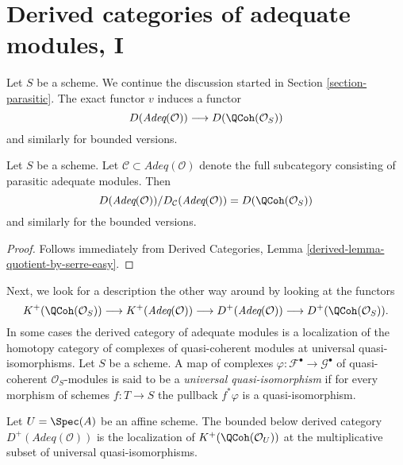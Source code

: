 \section{Derived categories of adequate modules, I}
\label{section-comparison}


\noindent
Let $S$ be a scheme. We continue the discussion started in
Section \ref{section-parasitic}.
The exact functor $v$ induces a functor
$$
D(\textit{Adeq}(\mathcal{O}))
\longrightarrow
D(\QCoh(\mathcal{O}_S))
$$
and similarly for bounded versions.

\begin{lemma}
\label{lemma-quotient-easy}
Let $S$ be a scheme. Let
$\mathcal{C} \subset \textit{Adeq}(\mathcal{O})$ denote the
full subcategory consisting of parasitic adequate modules.
Then
$$
D(\textit{Adeq}(\mathcal{O}))/D_\mathcal{C}(\textit{Adeq}(\mathcal{O}))
= D(\QCoh(\mathcal{O}_S))
$$
and similarly for the bounded versions.
\end{lemma}

\begin{proof}
Follows immediately from
Derived Categories, Lemma \ref{derived-lemma-quotient-by-serre-easy}.
\end{proof}

\noindent
Next, we look for a description the other way around by looking at
the functors
$$
K^+(\QCoh(\mathcal{O}_S))
\longrightarrow
K^+(\textit{Adeq}(\mathcal{O}))
\longrightarrow
D^+(\textit{Adeq}(\mathcal{O}))
\longrightarrow
D^+(\QCoh(\mathcal{O}_S)).
$$
In some cases the derived category of adequate modules is a localization
of the homotopy category of complexes of quasi-coherent modules at
universal quasi-isomorphisms. Let $S$ be a scheme. A map of complexes
$\varphi : \mathcal{F}^\bullet \to \mathcal{G}^\bullet$
of quasi-coherent $\mathcal{O}_S$-modules is said to be a
{\it universal quasi-isomorphism} if for every morphism of schemes
$f : T \to S$ the pullback $f^*\varphi$ is a quasi-isomorphism.

\begin{lemma}
\label{lemma-describe-Dplus-adequate}
Let $U = \Spec(A)$ be an affine scheme.
The bounded below derived category
$D^+(\textit{Adeq}(\mathcal{O}))$ is the localization
of $K^+(\QCoh(\mathcal{O}_U))$ at the multiplicative subset of
universal quasi-isomorphisms.
\end{lemma}

